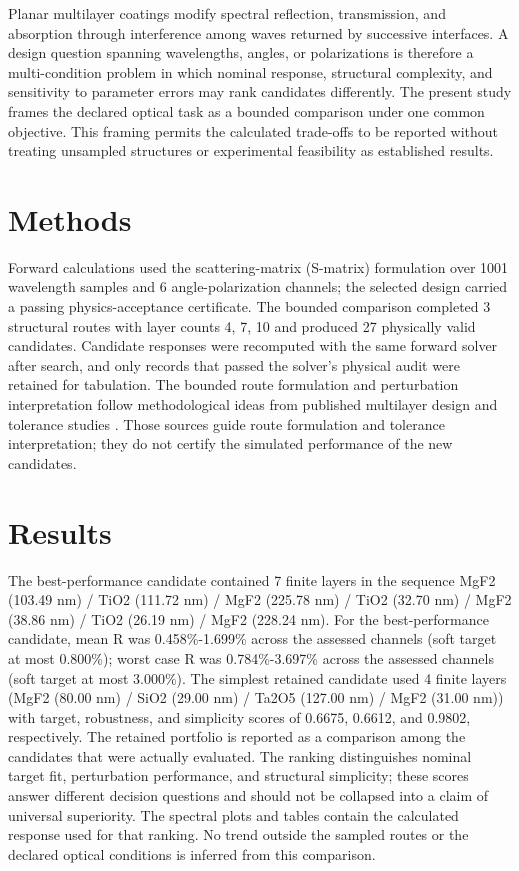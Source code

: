 Planar multilayer coatings modify spectral reflection, transmission, and absorption through interference among waves returned by successive interfaces. A design question spanning wavelengths, angles, or polarizations is therefore a multi-condition problem in which nominal response, structural complexity, and sensitivity to parameter errors may rank candidates differently. The present study frames the declared optical task as a bounded comparison under one common objective. This framing permits the calculated trade-offs to be reported without treating unsampled structures or experimental feasibility as established results.

\hypertarget{methods}{%
\section{Methods}\label{methods}}

Forward calculations used the scattering-matrix (S-matrix) formulation over 1001 wavelength samples and 6 angle-polarization channels; the selected design carried a passing physics-acceptance certificate. The bounded comparison completed 3 structural routes with layer counts 4, 7, 10 and produced 27 physically valid candidates. Candidate responses were recomputed with the same forward solver after search, and only records that passed the solver's physical audit were retained for tabulation. The bounded route formulation and perturbation interpretation follow methodological ideas from published multilayer design and tolerance studies \citep{corpusid_120897377_b2aeac7c} \citep{corpusid_284130796_49adbe34} \citep{corpusid_283155301_20887897}. Those sources guide route formulation and tolerance interpretation; they do not certify the simulated performance of the new candidates.

\hypertarget{results}{%
\section{Results}\label{results}}

The best-performance candidate contained 7 finite layers in the sequence MgF2 (103.49 nm) / TiO2 (111.72 nm) / MgF2 (225.78 nm) / TiO2 (32.70 nm) / MgF2 (38.86 nm) / TiO2 (26.19 nm) / MgF2 (228.24 nm). For the best-performance candidate, mean R was 0.458\%-1.699\% across the assessed channels (soft target at most 0.800\%); worst case R was 0.784\%-3.697\% across the assessed channels (soft target at most 3.000\%). The simplest retained candidate used 4 finite layers (MgF2 (80.00 nm) / SiO2 (29.00 nm) / Ta2O5 (127.00 nm) / MgF2 (31.00 nm)) with target, robustness, and simplicity scores of 0.6675, 0.6612, and 0.9802, respectively. The retained portfolio is reported as a comparison among the candidates that were actually evaluated. The ranking distinguishes nominal target fit, perturbation performance, and structural simplicity; these scores answer different decision questions and should not be collapsed into a claim of universal superiority. The spectral plots and tables contain the calculated response used for that ranking. No trend outside the sampled routes or the declared optical conditions is inferred from this comparison.

